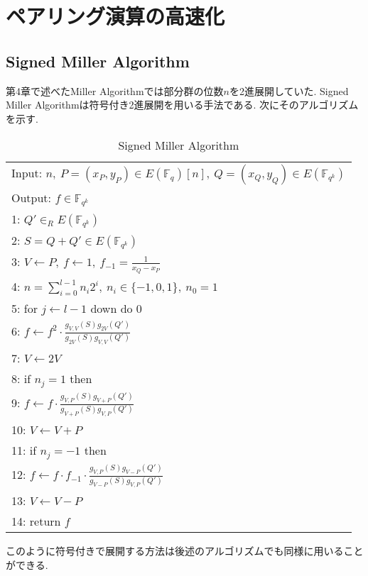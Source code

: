 \chapter{ペアリング演算の高速化}
\section{Signed Miller Algorithm}
第4章で述べたMiller Algorithmでは部分群の位数$n$を2進展開していた. Signed Miller Algorithmは符号付き2進展開を用いる手法である. 次にそのアルゴリズムを示す.
\par
\begin{table}[htbp]
 \begin{center}
  \begin{tabular}{|l|}
     \hline
     Input: $n, \ P = (x_P,y_P) \in E(\mathbb{F}_q)[n], \ Q = (x_Q,y_Q) \in E(\mathbb{F}_{q^k})$ \\
     Output: $f \in \mathbb{F}_{q^k}$  \\
     \hline
     1: \quad $Q' \in _R E(\mathbb{F}_{q^k})$\\
     2: \quad $S=Q+Q' \in E(\mathbb{F}_{q^k})$\\
     3: \quad $V \gets P, \ f \gets 1,\ f_{-1} = \frac{1}{x_Q - x_P}$\\
     4: \quad $n=\sum^{l - 1}_{i=0} n_i 2^i, \ n_i \in \{-1,0,1\},\ n_0 = 1$\\
     5: \quad for $j \gets l - 1$ down do 0\\
     6: \quad \quad $f \gets f^2 \cdot \frac{g_{V,V}(S)g_{2V}(Q')}{g_{2V}(S)g_{V,V}(Q')}$\\
     7: \quad \quad $V \gets 2V$\\
     8: \quad if $n_j = 1$ then\\
     9: \quad \quad $f \gets f \cdot \frac{g_{V,P}(S)g_{V + P}(Q')}{g_{V + P}(S)g_{V,P}(Q')}$\\
     10: \quad \quad $V \gets V + P$\\
     11: \quad if $n_j = -1$ then\\
     12: \quad \quad $f \gets f \cdot f_{-1} \cdot \frac{g_{V,P}(S)g_{V - P}(Q')}{g_{V - P}(S)g_{V,P}(Q')}$\\
     13: \quad \quad $V \gets V - P$\\
     14: \quad return $f$\\
     \hline
   \end{tabular}
 \end{center}
 \caption{Signed Miller Algorithm}
\end{table}
このように符号付きで展開する方法は後述のアルゴリズムでも同様に用いることができる.
\clearpage 
